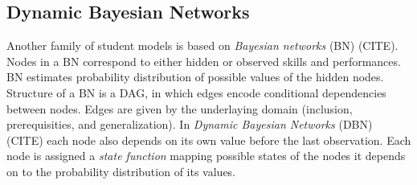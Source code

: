 %
%
%
%
%



\subsection{Dynamic Bayesian Networks}

Another family of student models is based on \emph{Bayesian networks} (BN) (CITE).
Nodes in a BN correspond to either hidden or observed skills and performances.
BN estimates probability distribution of possible values of the hidden nodes.
Structure of a BN is a DAG, in which edges encode conditional dependencies between nodes.
Edges are given by the
underlaying domain (inclusion, prerequisities, and generalization).  %
In \emph{Dynamic Bayesian Networks} (DBN) (CITE) each node also depends
on its own value before the last observation.
Each node is assigned a \emph{state function} mapping possible states of the nodes it
depends on to the probability distribution of its values.  %


